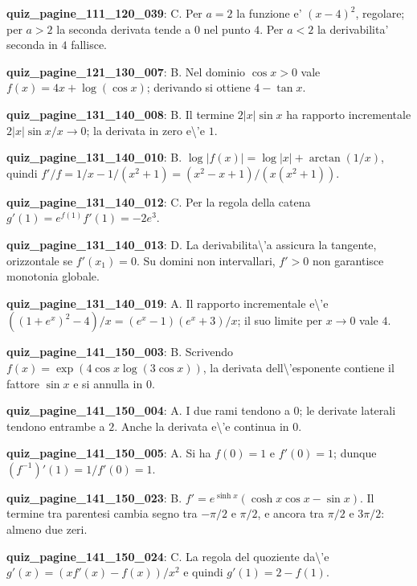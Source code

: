 \documentclass[11pt,a4paper]{article}
\newcounter{quiz}
\begin{document}
\noindent\textbf{quiz\_pagine\_111\_120\_039}: C. Per $a=2$ la funzione e' $(x-4)^2$, regolare; per $a>2$ la seconda derivata tende a $0$ nel punto $4$. Per $a<2$ la derivabilita' seconda in $4$ fallisce.\par\medskip
\noindent\textbf{quiz\_pagine\_121\_130\_007}: B. Nel dominio $\cos x>0$ vale $f(x)=4x+\log(\cos x)$; derivando si ottiene $4-\tan x$.\par\medskip
\noindent\textbf{quiz\_pagine\_131\_140\_008}: B. Il termine $2|x|\sin x$ ha rapporto incrementale $2|x|\sin x/x\to0$; la derivata in zero e\textbackslash{}'e $1$.\par\medskip
\noindent\textbf{quiz\_pagine\_131\_140\_010}: B. $\log|f(x)|=\log|x|+\arctan(1/x)$, quindi $f\prime/f=1/x-1/(x^2+1)=(x^2-x+1)/(x(x^2+1))$.\par\medskip
\noindent\textbf{quiz\_pagine\_131\_140\_012}: C. Per la regola della catena $g\prime(1)=e^{f(1)}f\prime(1)=-2e^3$.\par\medskip
\noindent\textbf{quiz\_pagine\_131\_140\_013}: D. La derivabilita\textbackslash{}'a assicura la tangente, orizzontale se $f\prime(x_1)=0$. Su domini non intervallari, $f\prime>0$ non garantisce monotonia globale.\par\medskip
\noindent\textbf{quiz\_pagine\_131\_140\_019}: A. Il rapporto incrementale e\textbackslash{}'e $((1+e^x)^2-4)/x=(e^x-1)(e^x+3)/x$; il suo limite per $x\to0$ vale $4$.\par\medskip
\noindent\textbf{quiz\_pagine\_141\_150\_003}: B. Scrivendo $f(x)=\exp(4\cos x\log(3\cos x))$, la derivata dell\textbackslash{}'esponente contiene il fattore $\sin x$ e si annulla in $0$.\par\medskip
\noindent\textbf{quiz\_pagine\_141\_150\_004}: A. I due rami tendono a $0$; le derivate laterali tendono entrambe a $2$. Anche la derivata e\textbackslash{}'e continua in $0$.\par\medskip
\noindent\textbf{quiz\_pagine\_141\_150\_005}: A. Si ha $f(0)=1$ e $f\prime(0)=1$; dunque $(f^{-1})\prime(1)=1/f\prime(0)=1$.\par\medskip
\noindent\textbf{quiz\_pagine\_141\_150\_023}: B. $f\prime=e^{\sinh x}(\cosh x\cos x-\sin x)$. Il termine tra parentesi cambia segno tra $-\pi/2$ e $\pi/2$, e ancora tra $\pi/2$ e $3\pi/2$: almeno due zeri.\par\medskip
\noindent\textbf{quiz\_pagine\_141\_150\_024}: C. La regola del quoziente da\textbackslash{}'e $g\prime(x)=(xf\prime(x)-f(x))/x^2$ e quindi $g\prime(1)=2-f(1)$.\par\medskip
\end{document}
